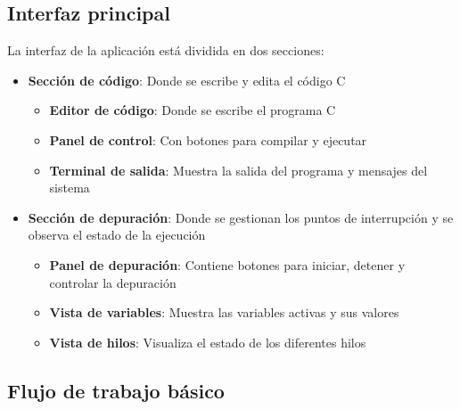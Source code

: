 \subsection{Interfaz principal}

La interfaz de la aplicación está dividida en dos secciones:
\begin{itemize}
    \item \textbf{Sección de código}: Donde se escribe y edita el código C
    
    \begin{itemize}
        
        \item \textbf{Editor de código}: Donde se escribe el programa C
        \item \textbf{Panel de control}: Con botones para compilar y ejecutar
        \item \textbf{Terminal de salida}: Muestra la salida del programa y mensajes del sistema

    \end{itemize}

    \item \textbf{Sección de depuración}: Donde se gestionan los puntos de interrupción y se observa el estado de la ejecución

    \begin{itemize}
            
        \item \textbf{Panel de depuración}: Contiene botones para iniciar, detener y controlar la depuración
        \item \textbf{Vista de variables}: Muestra las variables activas y sus valores
        \item \textbf{Vista de hilos}: Visualiza el estado de los diferentes hilos

    \end{itemize}
    
\end{itemize}

\subsection{Flujo de trabajo básico}

